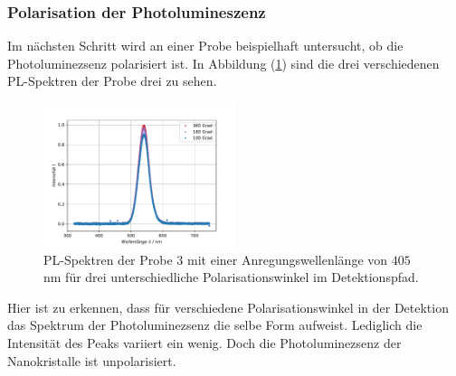 \subsubsection{Polarisation der Photolumineszenz}
Im n\"{a}chsten Schritt wird an einer Probe beispielhaft untersucht, ob die Photoluminezsenz polarisiert ist.
In Abbildung (\ref{abb:polarisation}) sind die drei verschiedenen PL-Spektren der Probe drei zu sehen.
\begin{figure}[hbtp]
	\centering
	\includegraphics[width=0.5\textwidth]{Plots/aufgabe1b.pdf}
	\caption{PL-Spektren der Probe 3 mit einer Anregungswellenl\"{a}nge von $405 \,$nm f\"{u}r drei unterschiedliche Polarisationswinkel im Detektionspfad.}
	\label{abb:polarisation}
\end{figure}
Hier ist zu erkennen, dass f\"{u}r verschiedene Polarisationswinkel in der Detektion das Spektrum der Photoluminezsenz die selbe Form aufweist.
Lediglich die Intensit\"{a}t des Peaks variiert ein wenig.
Doch die Photoluminezsenz der Nanokristalle ist unpolarisiert.

